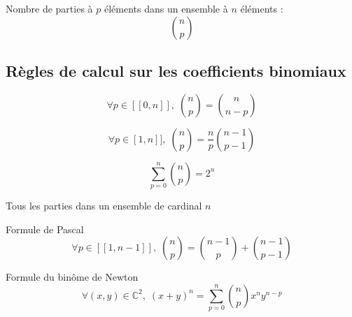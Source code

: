 \begin{Theorem}{
  }{}
Nombre de parties à $p$ éléments dans un ensemble à $n$ éléments : 
\begin{equation}
  \binom{n}{p}
\end{equation}
\end{Theorem}




\subsection{Règles de calcul sur les coefficients binomiaux} %
\label{sub:Règles de calcul sur les coefficients binomiaux}

\begin{Theorem}{}{}
\begin{equation}
  \forall p \in [\![0, n]\!], \; \binom{n}{p} = \binom{n}{n-p} 
\end{equation}
\end{Theorem}

\begin{Theorem}{}{}
\begin{equation}
  \forall p \in [\!1,n]\!], \; \binom{n}{p} = \frac{n}{p} \binom{n-1}{p-1}
\end{equation}
\end{Theorem}


\begin{Theorem}{}{}
\begin{equation}
  \sum_{p=0}^{n} \binom{n}{p} = 2 ^{n}
\end{equation}
\end{Theorem}

\begin{myproof}{}{}
Tous les parties dans un ensemble de cardinal $n$
\end{myproof}




\begin{Theorem}{Formule de Pascal}{}
\begin{equation}
\forall p \in [\![1, n-1]\!], \; \binom{n}{p}= \binom{n-1}{p} +\binom{n-1}{p-1}
\end{equation}
\end{Theorem}


\begin{Theorem}{Formule du binôme de Newton}{}
\begin{equation}
  \forall (x, y) \in \mathbb{C} ^{2}, \; (x+ y) ^{n} = \sum_{p=0}^{n} \binom{n}{p} x ^{n} y ^{n-p}
\end{equation}
\end{Theorem}








